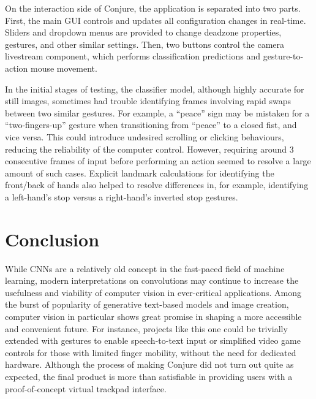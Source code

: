 \documentclass{article}
\begin{document}
On the interaction side of Conjure, the application is separated into two parts. First, the main GUI controls and updates all configuration changes in real-time. Sliders and dropdown menus are provided to change deadzone properties, gestures, and other similar settings. Then, two buttons control the camera livestream component, which performs classification predictions and gesture-to-action mouse movement.

In the initial stages of testing, the classifier model, although highly accurate for still images, sometimes had trouble identifying frames involving rapid swaps between two similar gestures. For example, a ``peace'' sign may be mistaken for a ``two-fingers-up'' gesture when transitioning from ``peace'' to a closed fist, and vice versa. This could introduce undesired scrolling or clicking behaviours, reducing the reliability of the computer control. However, requiring around 3 consecutive frames of input before performing an action seemed to resolve a large amount of such cases. Explicit landmark calculations for identifying the front/back of hands also helped to resolve differences in, for example, identifying a left-hand's stop versus a right-hand's inverted stop gestures.


\section{Conclusion}

While CNNs are a relatively old concept in the fast-paced field of machine learning, modern interpretations on convolutions may continue to increase the usefulness and viability of computer vision in ever-critical applications. Among the burst of popularity of generative text-based models and image creation, computer vision in particular shows great promise in shaping a more accessible and convenient future. For instance, projects like this one could be trivially extended with gestures to enable speech-to-text input or simplified video game controls for those with limited finger mobility, without the need for dedicated hardware. Although the process of making Conjure did not turn out quite as expected, the final product is more than satisfiable in providing users with a proof-of-concept virtual trackpad interface.



\pagebreak
\nocite{*} %
\printbibliography %
\end{document}
